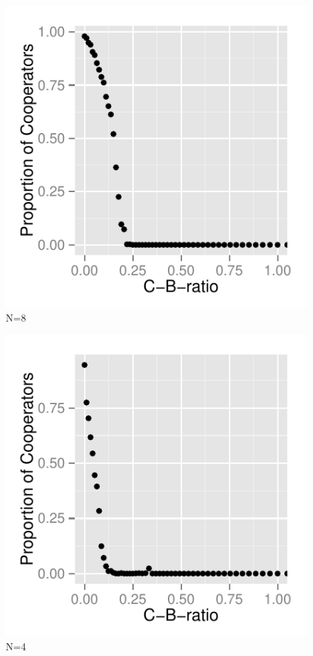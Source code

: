 \documentclass[DIV=calc, paper=a4, fontsize=11pt, twocolumn]{scrartcl}	 %
\begin{document}
\begin{figure}[here]
\centering
\begin{minipage}{.35\textwidth}
  \centering
  \includegraphics[width=1\linewidth]{PDN8}
 \caption{N=8}
\label{fig:PDm1}
\end{minipage}%
\end{figure}

\begin{figure}[here]
\centering
\begin{minipage}{.35\textwidth}
  \centering
  \includegraphics[width=1\linewidth]{PDN4}
 \caption{N=4}
\label{fig:PDn1}
\end{minipage}%
\end{figure}
\end{document}
